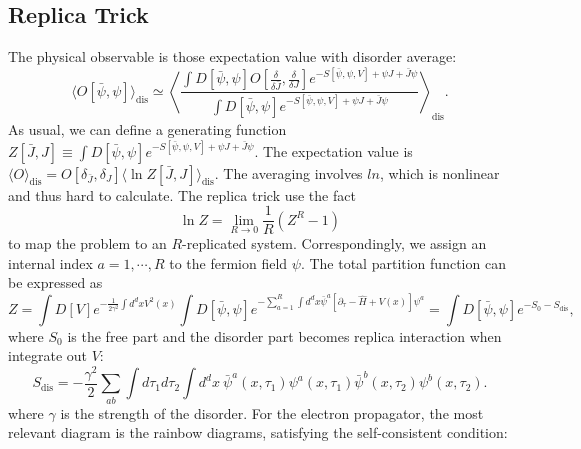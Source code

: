 \documentclass[aps,prb,superscriptaddress,nofootinbib]{revtex4}
\begin{document}
\subsection{Replica Trick}

The physical observable is those expectation value with disorder average:
\begin{equation}
	\langle O[\bar\psi,\psi] \rangle_{\mathrm{dis}} \simeq \left\langle \frac{\int D[\bar\psi,\psi] O\left[\frac{\delta}{\delta\bar J},\frac{\delta}{\delta J}\right] e^{-S[\bar\psi,\psi,V]+\psi J + \bar J \psi}}{\int D[\bar\psi,\psi] e^{-S[\bar\psi,\psi,V]+\psi J + \bar J \psi}}\right\rangle_\mathrm{dis}.
\end{equation}
As usual, we can define a generating function $Z[\bar J, J] \equiv \int D[\bar\psi,\psi] e^{-S[\bar\psi,\psi,V]+\psi J + \bar J \psi}$.
The expectation value is $\langle O\rangle_\mathrm{dis} = O\left[\delta_{\bar J},\delta _J \right] \langle \ln Z[\bar J, J] \rangle_\mathrm{dis}$.
The averaging involves $ln$, which is nonlinear and thus hard to calculate.
The replica trick use the fact
\begin{equation}
	\ln Z = \lim_{R\rightarrow 0}\frac{1}{R}(Z^R-1)
\end{equation}
to map the problem to an $R$-replicated system.
Correspondingly, we assign an internal index $a=1,\cdots,R$ to the fermion field $\psi$.
The total partition function can be expressed as
\begin{equation}
	Z = \int D[V] e^{-\frac{1}{2\gamma^2}\int d^d x V^2(x)} \int D[\bar\psi,\psi] e^{-\sum_{a=1}^R\int d^d x \bar\psi^a[\partial_\tau-\hat H + V(x)]\psi^a} 
	= \int D[\bar\psi,\psi] e^{-S_0-S_{\mathrm{dis}}}, 
\end{equation}
where $S_0$ is the free part and the disorder part becomes replica interaction when integrate out $V$:
\begin{equation}
	S_\mathrm{dis} = - \frac{\gamma^2}{2} \sum_{ab}\int d\tau_1d\tau_2 \int d^d x\ \bar\psi^a(x,\tau_1)\psi^a(x,\tau_1)\bar\psi^b(x,\tau_2)\psi^b(x,\tau_2).
\end{equation}
where $\gamma$ is the strength of the disorder.
For the electron propagator, the most relevant diagram is the rainbow diagrams, satisfying the self-consistent condition:
\end{document}
